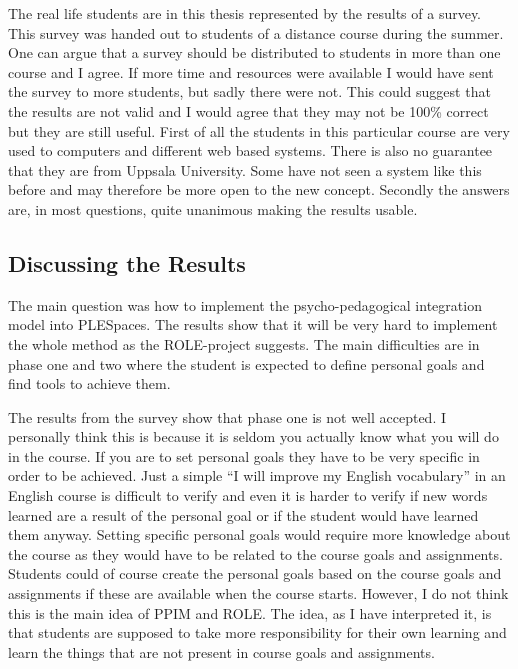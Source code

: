 The real life students are in this thesis represented by the results of a survey. This survey was handed out to students of a distance course during the summer. One can argue that a survey should be distributed to students in more than one course and I agree. If more time and resources were available I would have sent the survey to more students, but sadly there were not. This could suggest that the results are not valid and I would agree that they may not be 100\% correct but they are still useful. First of all the students in this particular course are very used to computers and different web based systems. There is also no guarantee that they are from Uppsala University. Some have not seen a system like this before and may therefore be more open to the new concept. Secondly the answers are, in most questions, quite unanimous making the results usable.

\subsection {Discussing the Results}
The main question was how to implement the psycho-pedagogical integration model into PLESpaces. The results show that it will be very hard to implement the whole method as the ROLE-project suggests. The main difficulties are in phase one and two where the student is expected to define personal goals and find tools to achieve them.

The results from the survey show that phase one is not well accepted. I personally think this is because it is seldom you actually know what you will do in the course. If you are to set personal goals they have to be very specific in order to be achieved. Just a simple “I will improve my English vocabulary” in an English course is difficult to verify and even it is harder to verify if new words learned are a result of the personal goal or if the student would have learned them anyway. Setting specific personal goals would require more knowledge about the course as they would have to be related to the course goals and assignments. Students could of course create the personal goals based on the course goals and assignments if these are available when the course starts. However, I do not think this is the main idea of PPIM and ROLE. The idea, as I have interpreted it, is that students are supposed to take more responsibility for their own learning and learn the things that are not present in course goals and assignments.

